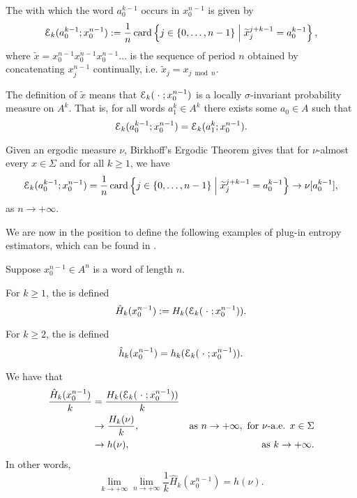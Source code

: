 \begin{definition}
	The  with which the word $a_0^{k - 1}$ occurs in $x_0^{n - 1}$ is given by
	\[
		\mathcal{E}_k(a_0^{k - 1}; x_0^{n - 1}) := \frac{1}{n}\operatorname{card}\left\{j \in \{0, \dots, n - 1\} \mathrel{}\middle|\mathrel{} \widetilde{x}_j^{j + k - 1} = a_0^{k - 1} \right\},
	\]
	where $\tilde{x} = x_0^{n - 1} x_0^{n - 1} x_0^{n - 1} \dots$ is the sequence of period $n$ obtained by concatenating $x_j^{n - 1}$ continually, i.e. $\tilde{x}_j = x_{j \bmod n}$.
\end{definition}

The definition of $\tilde{x}$ means that $\mathcal{E}_k(\mathrel{}\cdot\mathrel{}; x_0^{n - 1})$ is a locally $\sigma$-invariant probability measure on $A^k$. That is, for all words $a_1^k \in A^k$ there exists some $a_0 \in A$ such that
\[
	\mathcal{E}_k(a_0^{k - 1}; x_0^{n - 1}) = \mathcal{E}_k(a_1^k; x_0^{n - 1}).
\]

Given an ergodic measure $\nu$, Birkhoff's Ergodic Theorem gives that for $\nu$-almost every $x \in \Sigma$ and for all $k \geq 1$, we have
\[
	\mathcal{E}_k(a_0^{k - 1}; x_0^{n - 1}) = \frac{1}{n}\operatorname{card}\left\{j \in \{0, \dots, n - 1\} \mathrel{}\middle|\mathrel{} \widetilde{x}_j^{j + k - 1} = a_0^{k - 1} \right\} \to \nu[a_0^{k - 1}],
\]
as $n \to +\infty$.

We are now in the position to define the following examples of plug-in entropy estimators, which can be found in \cite[Definition 2.1]{chazottes-gabrielle:large-deviations}.

\begin{definition}
	Suppose $x_0^{n - 1} \in A^n$ is a word of length $n$.
	
	For $k \geq 1$, the  is defined
	\[
		\hat{H}_k(x_0^{n - 1}) := H_k(\mathcal{E}_k(\mathrel{}\cdot\mathrel{}; x_0^{n - 1})).
	\]
	
	For $k \geq 2$, the  is defined
	\[
		\hat{h}_k(x_0^{n - 1}) = h_k(\mathcal{E}_k(\mathrel{}\cdot\mathrel{}; x_0^{n - 1})).
	\]
\end{definition}

We have that
\begin{align*}
	\frac{\hat{H}_k(x_0^{n - 1})}{k} &= \frac{H_k(\mathcal{E}_k(\mathrel{}\cdot\mathrel{}; x_0^{n - 1}))}{k} \\
		&\to \frac{H_k(\nu)}{k}, & \text{as } n \to +\infty, \text{ for } \nu \text{-a.e. } x \in \Sigma  \\
		&\to h(\nu),	& \text{as } k \to +\infty.
\end{align*}
In other words,
\[
	\lim_{k \to +\infty} \lim_{n \to +\infty}{\frac{1}{k} \hat{H}_k(x_0^{n - 1})} = h(\nu).
\]

